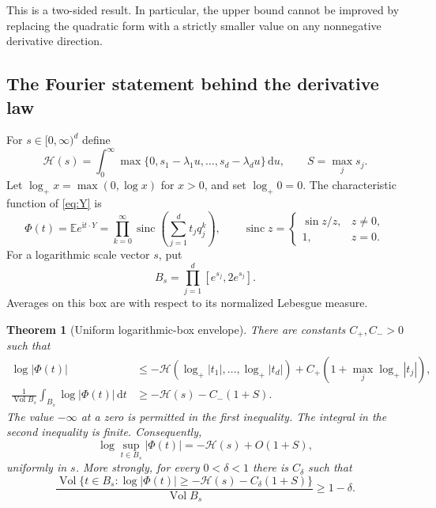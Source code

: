 \documentclass[11pt,a4paper]{article}
\numberwithin{equation}{section}
\newtheorem{theorem}{Theorem}[section]
\theoremstyle{definition}
\theoremstyle{remark}\newtheorem{remark}[theorem]{Remark}
\newcommand{\E}{\mathbb E}\newcommand{\Prob}{\mathbb P}
\newcommand{\dd}{\,\mathrm d}
\newcommand{\ii}{\mathrm i}
\newcommand{\sinc}{\operatorname{sinc}}
\newcommand{\Vol}{\operatorname{Vol}}
\newcommand{\He}{\mathcal H}
\newcommand{\lp}{\log_+}
\begin{document}
This is a two-sided result. In particular, the upper bound cannot be improved
by replacing the quadratic form with a strictly smaller value on any
nonnegative derivative direction.

\subsection{The Fourier statement behind the derivative law}

For $s\in[0,\infty)^d$ define
\begin{equation}
 \He(s)=\int_0^\infty \max\{0,s_1-\lambda_1u,\ldots,s_d-\lambda_du\}\dd u,
 \qquad S=\max_js_j.
 \label{eq:H}
\end{equation}
Let $\lp x=\max(0,\log x)$ for $x>0$, and set $\lp0=0$. The characteristic
function of \eqref{eq:Y} is
\begin{equation}
 \Phi(t)=\E e^{\ii t\cdot Y}
       =\prod_{k=0}^{\infty}\sinc\!\left(\sum_{j=1}^dt_jq_j^k\right),
 \qquad \sinc z=\begin{cases}\sin z/z,&z\ne0,\\1,&z=0.\end{cases}
 \label{eq:Phi}
\end{equation}
For a logarithmic scale vector $s$, put
\begin{equation}
 B_s=\prod_{j=1}^d[e^{s_j},2e^{s_j}].
 \label{eq:box}
\end{equation}
Averages on this box are with respect to its normalized Lebesgue measure.

\begin{theorem}[Uniform logarithmic-box envelope]
\label{thm:envelope}
There are constants $C_+,C_->0$ such that
\begin{align}
 \log|\Phi(t)|&\le-\He(\lp|t_1|,\ldots,\lp|t_d|)
                  +C_+(1+\max_j\lp|t_j|),\label{eq:upper-envelope}\\
 \frac1{\Vol B_s}\int_{B_s}\log|\Phi(t)|\dd t
       &\ge-\He(s)-C_-(1+S).\label{eq:mean-envelope}
\end{align}
The value $-\infty$ at a zero is permitted in the first inequality. The
integral in the second inequality is finite. Consequently,
\begin{equation}
 \log\sup_{t\in B_s}|\Phi(t)|=-\He(s)+O(1+S),
 \label{eq:boxsup}
\end{equation}
uniformly in $s$. More strongly, for every $0<\delta<1$ there is $C_\delta$
such that
\begin{equation}
 \frac{\Vol\{t\in B_s:\log|\Phi(t)|\ge-\He(s)-C_\delta(1+S)\}}
      {\Vol B_s}\ge1-\delta.
 \label{eq:goodset}
\end{equation}
\end{theorem}
\end{document}
